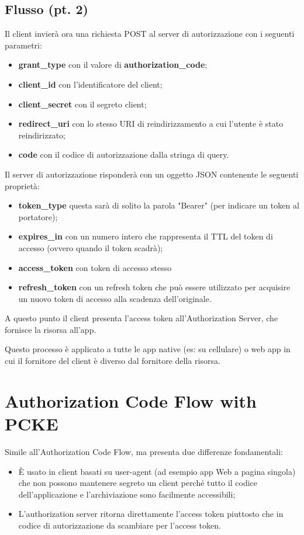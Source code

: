 \subsection{Flusso (pt. 2)}
Il client invierà ora una richiesta POST al server di autorizzazione con i seguenti parametri:
\begin{itemize}
    \item \textbf{grant\_type} con il valore di \textbf{authorization\_code};
    \item \textbf{client\_id} con l'identificatore del client;
    \item \textbf{client\_secret} con il segreto client;
    \item \textbf{redirect\_uri} con lo stesso URI di reindirizzamento a cui l'utente è stato reindirizzato;
    \item \textbf{code} con il codice di autorizzazione dalla stringa di query.
\end{itemize}

\noindent Il server di autorizzazione risponderà con un oggetto JSON contenente le seguenti proprietà:
\begin{itemize}
    \item \textbf{token\_type} questa sarà di solito la parola "Bearer" (per indicare un token al portatore);
    \item \textbf{expires\_in} con un numero intero che rappresenta il TTL del token di accesso (ovvero quando il token scadrà);
    \item \textbf{access\_token} con token di accesso stesso
    \item \textbf{refresh\_token} con un refresh token che può essere utilizzato per acquisire un nuovo token di accesso alla scadenza dell'originale.
\end{itemize}

\noindent A questo punto il client presenta l'access token all'Authorization Server, che fornisce la risorsa all'app.

Questo processo è applicato a tutte le app native (es: su cellulare) o web app in cui il fornitore del client è diverso dal fornitore della risorsa.

\section{Authorization Code Flow with PCKE}
Simile all'Authorization Code Flow, ma presenta due differenze fondamentali:
\begin{itemize}
    \item È usato in client basati su user-agent (ad esempio app Web a pagina singola) che non possono mantenere segreto un client perché tutto il codice dell'applicazione e l'archiviazione sono facilmente accessibili;
    \item L'authorization server ritorna direttamente l'access token piuttosto che in codice di autorizzazione da scambiare per l'access token.
\end{itemize}

